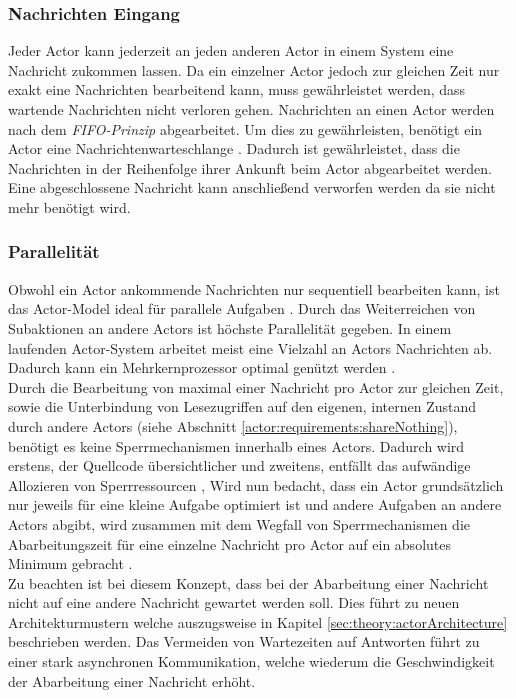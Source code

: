 \subsubsection{Nachrichten Eingang}\label{actor:Mailbox}
Jeder Actor kann jederzeit an jeden anderen Actor in einem System eine Nachricht zukommen lassen. Da ein einzelner Actor jedoch zur gleichen Zeit nur exakt eine Nachrichten bearbeitend kann, muss gewährleistet werden, dass wartende Nachrichten nicht verloren gehen. Nachrichten an einen Actor werden nach dem \textit{FIFO-Prinzip} abgearbeitet. 
Um dies zu gewährleisten, benötigt ein Actor eine Nachrichtenwarteschlange \citep{Agha1985ActorsSystems}. Dadurch ist gewährleistet, dass die Nachrichten in der Reihenfolge ihrer Ankunft beim Actor abgearbeitet werden. Eine abgeschlossene Nachricht kann anschließend verworfen werden da sie nicht mehr benötigt wird. 

\subsubsection{Parallelität}\label{actor:parallelism}
Obwohl ein Actor ankommende Nachrichten nur sequentiell bearbeiten kann, ist das Actor-Model ideal für parallele Aufgaben \citep{hewitt1973session}. Durch das Weiterreichen von Subaktionen an andere Actors ist höchste Parallelität gegeben. In einem laufenden Actor-System arbeitet meist eine Vielzahl an Actors Nachrichten ab. Dadurch kann ein Mehrkernprozessor optimal genützt werden \citep{Agha1985ActorsSystems}. \\ 
Durch die Bearbeitung von maximal einer Nachricht pro Actor zur gleichen Zeit, sowie die Unterbindung von Lesezugriffen auf den eigenen, internen Zustand durch andere Actors (siehe Abschnitt \ref{actor:requirements:shareNothing}), benötigt es keine Sperrmechanismen innerhalb eines Actors. Dadurch wird erstens, der Quellcode übersichtlicher und zweitens, entfällt das aufwändige Allozieren von Sperrressourcen \citep{Vernon2015ReactiveAkka},
Wird nun bedacht, dass ein Actor grundsätzlich nur jeweils für eine kleine Aufgabe optimiert ist und andere Aufgaben an andere Actors abgibt, wird zusammen mit dem Wegfall von Sperrmechanismen die Abarbeitungszeit für eine einzelne Nachricht pro Actor auf ein absolutes Minimum gebracht \citep{Vernon2015ReactiveAkka}. \\
Zu beachten ist bei diesem Konzept, dass bei der Abarbeitung einer Nachricht nicht auf eine andere Nachricht gewartet werden soll. Dies führt zu neuen Architekturmustern welche auszugsweise in Kapitel \ref{sec:theory:actorArchitecture} beschrieben werden. Das Vermeiden von Wartezeiten auf Antworten führt zu einer stark asynchronen Kommunikation, welche wiederum die Geschwindigkeit der Abarbeitung einer Nachricht erhöht.

